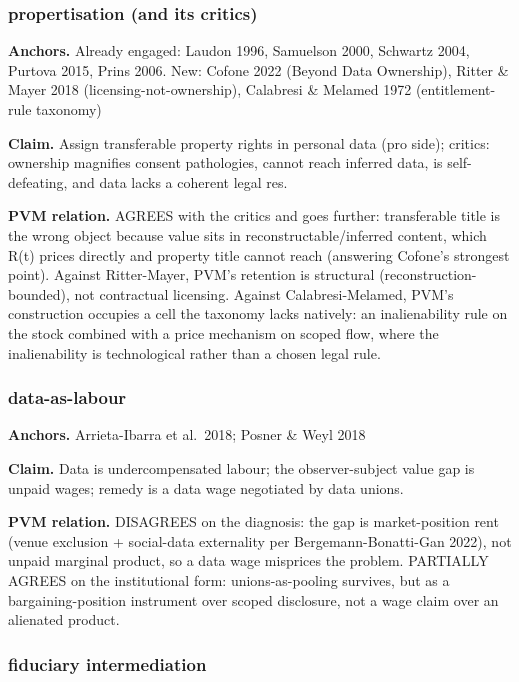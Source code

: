 \documentclass[
  11pt,
]{article}
\begin{document}
\subsubsection{propertisation (and its
critics)}\label{propertisation-and-its-critics}

\textbf{Anchors.} Already engaged: Laudon 1996, Samuelson 2000, Schwartz
2004, Purtova 2015, Prins 2006. New: Cofone 2022 (Beyond Data
Ownership), Ritter \& Mayer 2018 (licensing-not-ownership), Calabresi \&
Melamed 1972 (entitlement-rule taxonomy)

\textbf{Claim.} Assign transferable property rights in personal data
(pro side); critics: ownership magnifies consent pathologies, cannot
reach inferred data, is self-defeating, and data lacks a coherent legal
res.

\textbf{PVM relation.} AGREES with the critics and goes further:
transferable title is the wrong object because value sits in
reconstructable/inferred content, which R(t) prices directly and
property title cannot reach (answering Cofone's strongest point).
Against Ritter-Mayer, PVM's retention is structural
(reconstruction-bounded), not contractual licensing. Against
Calabresi-Melamed, PVM's construction occupies a cell the taxonomy lacks
natively: an inalienability rule on the stock combined with a price
mechanism on scoped flow, where the inalienability is technological
rather than a chosen legal rule.

\subsubsection{data-as-labour}\label{data-as-labour}

\textbf{Anchors.} Arrieta-Ibarra et al.~2018; Posner \& Weyl 2018

\textbf{Claim.} Data is undercompensated labour; the observer-subject
value gap is unpaid wages; remedy is a data wage negotiated by data
unions.

\textbf{PVM relation.} DISAGREES on the diagnosis: the gap is
market-position rent (venue exclusion + social-data externality per
Bergemann-Bonatti-Gan 2022), not unpaid marginal product, so a data wage
misprices the problem. PARTIALLY AGREES on the institutional form:
unions-as-pooling survives, but as a bargaining-position instrument over
scoped disclosure, not a wage claim over an alienated product.

\subsubsection{fiduciary intermediation}\label{fiduciary-intermediation}
\end{document}
